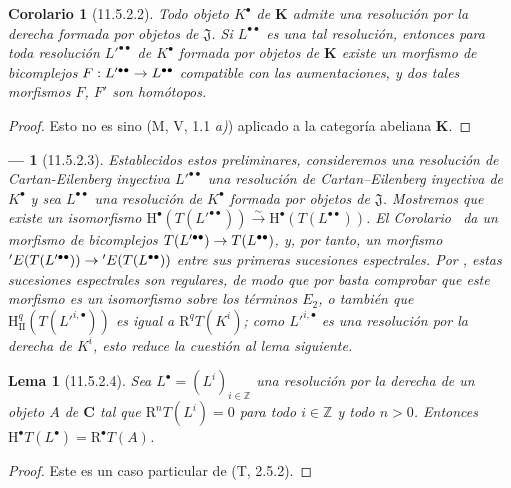 \documentclass[10pt,oneside,openany]{book}
\theoremstyle{egaenv}\newtheorem*{env}{---}
\theoremstyle{egastatement}
\newtheorem*{lemma}{Lema}
\newtheorem*{corollary}{Corolario}
\theoremstyle{egadescription}
\newcommand{\oldpage}[2][]{\marginnote{\normalfont\scriptsize\textbf{#1}\,|\,#2}\ignorespaces}
\renewcommand{\to}{\mathchoice{\longrightarrow}{\rightarrow}{\rightarrow}{\rightarrow}}
\begin{document}
\begin{corollary}[11.5.2.2]
\label{0.11.5.2.2}
\label{0.11.5.2.2-fr}
Todo objeto $K^\bullet$ de $\boldsymbol{K}$ admite una resolución por la derecha formada por objetos de $\mathfrak J$.
Si $L^{\bullet\bullet}$ es una tal resolución, entonces para toda resolución $L'^{\bullet\bullet}$ de $K^\bullet$ formada por objetos de $\boldsymbol{K}$ existe un morfismo de bicomplejos
$F:L'^{\bullet\bullet}\to L^{\bullet\bullet}$ compatible con las aumentaciones, y dos tales morfismos $F$, $F'$ son homótopos.
\end{corollary}

\begin{proof}
Esto no es sino (M, V, 1.1 \emph{a)}) aplicado a la categoría abeliana
$\boldsymbol{K}$.
\end{proof}

\begin{env}[11.5.2.3]
\label{0.11.5.2.3-fr}
Establecidos estos preliminares, consideremos una resolución de Cartan-Eilenberg inyectiva $L'^{\bullet\bullet}$ una resolución de Cartan--Eilenberg inyectiva de $K^\bullet$ y sea $L^{\bullet\bullet}$ una resolución de $K^\bullet$ formada por objetos de $\mathfrak J$.
Mostremos que existe un isomorfismo
$\mathrm H^\bullet(T(L'^{\bullet\bullet}))\xrightarrow{\sim}\mathrm H^\bullet(T(L^{\bullet\bullet}))$.
El Corolario~ da un morfismo de bicomplejos
$T(L'^{\bullet\bullet})\to T(L^{\bullet\bullet})$,
y, por tanto, un morfismo
$'E(T(L'^{\bullet\bullet}))\to{}'E(T(L^{\bullet\bullet}))$
entre sus primeras sucesiones espectrales.
Por , estas sucesiones espectrales son \emph{regulares}, de modo que por  basta comprobar que este morfismo es un isomorfismo sobre los términos $E_2$, o también que
$\mathrm H_{\mathrm{II}}^q(T(L'^{i,\bullet}))$ es igual a
$\mathrm R^qT(K^i)$; como $L'^{i,\bullet}$ es una resolución por la derecha de $K^i$, esto reduce la cuestión al lema siguiente.
\end{env}

\oldpage[0\textsubscript{III}]{38}
\begin{lemma}[11.5.2.4]
\label{0.11.5.2.4}
\label{0.11.5.2.4-fr}
Sea $L^\bullet=(L^i)_{i\in\mathbb Z}$ una resolución por la derecha de un objeto $A$ de $\boldsymbol{C}$ tal que $\mathrm R^nT(L^i)=0$ para todo $i\in\mathbb Z$ y todo $n>0$.
Entonces
$\mathrm H^\bullet T(L^\bullet)=\mathrm R^\bullet T(A)$.
\end{lemma}

\begin{proof}
Este es un caso particular de (T, 2.5.2).
\end{proof}
\end{document}
